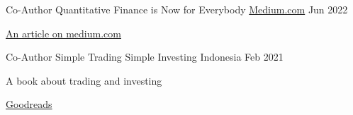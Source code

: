 

\begin{cventries}

  \cventry
    {Co-Author} %
    {Quantitative Finance is Now for Everybody} %
    {\href{https://medium.com/@nikkisatmaka/quantitative-finance-is-now-for-everybody-a13947f91a74}{Medium.com}} %
    {Jun 2022} %
    {
      \begin{cvitems} %
        \item {\href{https://medium.com/@nikkisatmaka/quantitative-finance-is-now-for-everybody-a13947f91a74}{An article on medium.com}}
      \end{cvitems}
    }

  \cventry
    {Co-Author} %
    {Simple Trading Simple Investing} %
    {Indonesia} %
    {Feb 2021} %
    {
      \begin{cvitems} %
        \item {A book about trading and investing}
        \item {\href{https://www.goodreads.com/book/show/56866215-simple-trading-simple-investing}{Goodreads}}
      \end{cvitems}
    }

\end{cventries}
